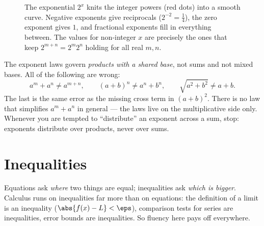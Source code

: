\begin{figure}[H]
\centering
{}
\caption{The exponential $2^x$ knits the integer powers (red dots) into a smooth
curve. Negative exponents give reciprocals ($2^{-2}=\tfrac14$), the zero exponent
gives $1$, and fractional exponents fill in everything between. The values for
non-integer $x$ are precisely the ones that keep $2^{m+n}=2^m2^n$ holding for all
real $m,n$.}
\label{ch40:fig-exp}
\end{figure}

\begin{trapbox}
The exponent laws govern \emph{products with a shared base}, not sums and not
mixed bases. All of the following are wrong:
\[
  a^m + a^n \neq a^{m+n}, \qquad
  (a+b)^n \neq a^n + b^n, \qquad
  \sqrt{a^2+b^2} \neq a + b.
\]
The last is the same error as the missing cross term in $(a+b)^2$. There is no law
that simplifies $a^m + a^n$ in general --- the laws live on the multiplicative side
only. Whenever you are tempted to ``distribute'' an exponent across a sum, stop:
exponents distribute over products, never over sums.
\end{trapbox}

\section{Inequalities}
\label{ch40:inequalities}

Equations ask \emph{where} two things are equal; inequalities ask \emph{which is
bigger}. Calculus runs on inequalities far more than on equations: the definition
of a limit is an inequality ($\abs{f(x)-L}<\eps$), comparison tests for series are
inequalities, error bounds are inequalities. So fluency here pays off everywhere.

